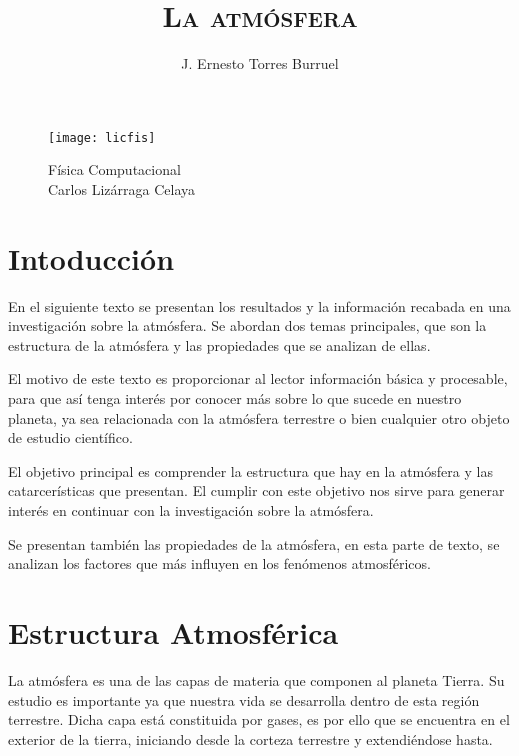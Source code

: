 \documentclass[12pt]{article}
\title{\huge \textbf{\textsc{La atmósfera}}}%
\author{J. Ernesto Torres Burruel}
\begin{document}
\begin{titlepage}%
\pagestyle{empty}%

\begin{figure}[h]
    \centering
    \texttt{[image: licfis]}
    {\huge \maketitle}
    {\large Física Computacional\\Carlos Lizárraga Celaya}
\end{figure}
\end{titlepage}

\newpage
\tableofcontents

\newpage %
\section{Intoducción}
En el siguiente texto se presentan los resultados y la información recabada en una investigación sobre la atmósfera. Se abordan dos temas principales, que son la estructura de la atmósfera y las propiedades que se analizan de ellas.

El motivo de este texto es proporcionar al lector información básica y procesable, para que así tenga interés por conocer más sobre lo que sucede en nuestro planeta, ya sea relacionada con la atmósfera terrestre o bien cualquier otro objeto de estudio científico.

El objetivo principal es comprender la estructura que hay en la atmósfera y las catarcerísticas que presentan. El cumplir con este objetivo nos sirve para generar interés en continuar con la investigación sobre la atmósfera.

Se presentan también las propiedades de la atmósfera, en esta parte de texto, se analizan los factores que más influyen en los fenómenos atmosféricos.

\newpage

\section{Estructura Atmosférica}
La atmósfera es una de las capas de materia que componen al planeta Tierra. Su estudio es importante ya que nuestra vida se desarrolla dentro de esta región terrestre. Dicha capa está constituida por gases, es por ello que se encuentra en el exterior de la tierra, iniciando desde la corteza terrestre y extendiéndose hasta.
\end{document}
